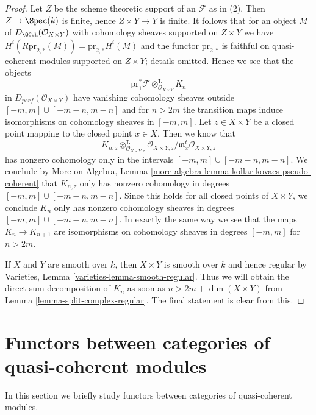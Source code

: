\begin{proof}
Let $Z$ be the scheme theoretic support of an $\mathcal{F}$ as in (2).
Then $Z \to \Spec(k)$ is finite, hence $Z \times Y \to Y$ is finite.
It follows that for an object $M$ of $D_\QCoh(\mathcal{O}_{X \times Y})$
with cohomology sheaves supported on $Z \times Y$ we have
$H^i(R\text{pr}_{2, *}(M)) = \text{pr}_{2, *}H^i(M)$ and the functor
$\text{pr}_{2, *}$ is faithful on quasi-coherent modules supported
on $Z \times Y$; details omitted. Hence we see that the objects
$$
\text{pr}_1^*\mathcal{F} \otimes_{\mathcal{O}_{X \times Y}}^\mathbf{L} K_n
$$
in $D_{perf}(\mathcal{O}_{X \times Y})$ have vanishing cohomology sheaves
outside $[-m, m] \cup [-m - n, m - n]$ and for $n > 2m$ the transition maps
induce isomorphisms on cohomology sheaves in $[-m, m]$.
Let $z \in X \times Y$ be a closed point mapping to the closed point
$x \in X$. Then we know that
$$
K_{n, z} \otimes_{\mathcal{O}_{X \times Y, z}}^\mathbf{L}
\mathcal{O}_{X \times Y, z}/\mathfrak m_x^t\mathcal{O}_{X \times Y, z}
$$
has nonzero cohomology only in the intervals
$[-m, m] \cup [-m - n, m - n]$.
We conclude by More on Algebra, Lemma
\ref{more-algebra-lemma-kollar-kovacs-pseudo-coherent}
that $K_{n, z}$ only has nonzero cohomology
in degrees $[-m, m] \cup [-m - n, m - n]$. Since this holds for all
closed points of $X \times Y$, we conclude $K_n$ only has nonzero
cohomology sheaves in degrees $[-m, m] \cup [-m - n, m - n]$.
In exactly the same way we see that the maps $K_n \to K_{n + 1}$
are isomorphisms on cohomology sheaves in degrees $[-m, m]$
for $n > 2m$.

\medskip\noindent
If $X$ and $Y$ are smooth over $k$, then $X \times Y$ is smooth
over $k$ and hence regular by
Varieties, Lemma \ref{varieties-lemma-smooth-regular}.
Thus we will obtain the direct sum decomposition of $K_n$
as soon as $n > 2m + \dim(X \times Y)$ from
Lemma \ref{lemma-split-complex-regular}. The final statement
is clear from this.
\end{proof}









\section{Functors between categories of quasi-coherent modules}
\label{section-functor-quasi-coherent}

\noindent
In this section we briefly study functors between categories of
quasi-coherent modules.

